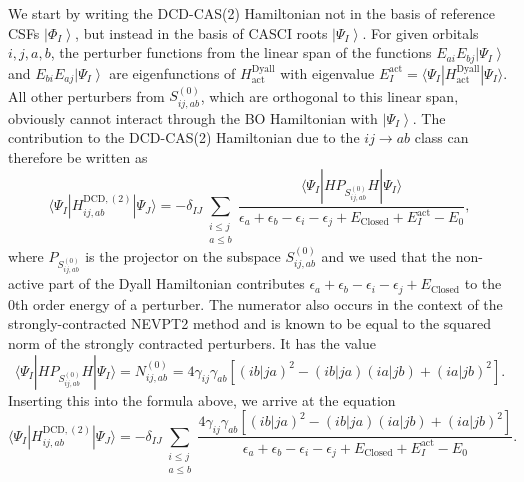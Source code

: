 We start by writing the DCD-CAS(2) Hamiltonian not in the basis of reference CSFs $\left| {{\Phi _I}} \right\rangle $, but instead in the basis of CASCI roots $\left| {{\Psi _I}} \right\rangle $. For given orbitals $i,j,a,b$, the perturber functions from the linear span of the functions $E_{ai}E_{bj}\left| {{\Psi _I}} \right\rangle $ and $E_{bi}E_{aj}\left| {{\Psi _I}} \right\rangle $ are eigenfunctions of $H_{{\text{act}}}^{{\text{Dyall}}}$ with eigenvalue $E_I^{{\text{act}}} = \langle {\Psi _I}|H_{{\text{act}}}^{{\text{Dyall}}}|{\Psi _I}\rangle $. All other perturbers from $S_{ij,ab}^{(0)}$, which are orthogonal to this linear span, obviously cannot interact through the BO Hamiltonian with $\left| {{\Psi _I}} \right\rangle $. The contribution to the DCD-CAS(2) Hamiltonian due to the $ij\rightarrow ab$ class can therefore be written as
\begin{equation}
\langle \Psi_I | H_{ij,ab}^{\text{DCD}, (2)} | \Psi_J\rangle = - \delta_{IJ} \sum_{\substack{i\leq j \\ a \leq b}} \frac{\langle \Psi_I | H P_{S_{ij,ab}^{(0)}} H | \Psi_I\rangle}{\epsilon_a + \epsilon_b - \epsilon_i - \epsilon_j + E_\text{Closed} + E_I^\text{act} - E_0},
\end{equation}
where ${P_{S_{ij,ab}^{(0)}}}$ is the projector on the subspace $S_{ij,ab}^{(0)}$ and we used that the non-active part of the Dyall Hamiltonian contributes $\epsilon_a+\epsilon_b-\epsilon_i-\epsilon_j+E_\text{Closed}$ to the 0th order energy of a perturber. The numerator also occurs in the context of the strongly-contracted NEVPT2 method and is known to be equal to the squared norm of the strongly contracted perturbers.\cite{AngelCM_2002_9138} It has the value
\begin{equation}
\langle {\Psi _I}|H{P_{S_{ij,ab}^{(0)}}}H|{\Psi _I}\rangle  = N_{ij,ab}^{(0)} = 4{\gamma _{ij}}{\gamma _{ab}}[{(ib|ja)^2} - (ib|ja)(ia|jb) + {(ia|jb)^2}].
\end{equation}		
Inserting this into the formula above, we arrive at the equation
\begin{equation}
\label{Eq:ijab_matrixel}
\langle \Psi_I | H_{ij,ab}^{\text{DCD}, (2)} | \Psi_J\rangle = - \delta_{IJ} \sum_{\substack{i\leq j \\ a \leq b}} \frac{4{\gamma _{ij}}{\gamma _{ab}}[{(ib|ja)^2} - (ib|ja)(ia|jb) + {(ia|jb)^2}]}{\epsilon_a + \epsilon_b - \epsilon_i - \epsilon_j + E_\text{Closed} + E_I^\text{act} - E_0}.
\end{equation}				
